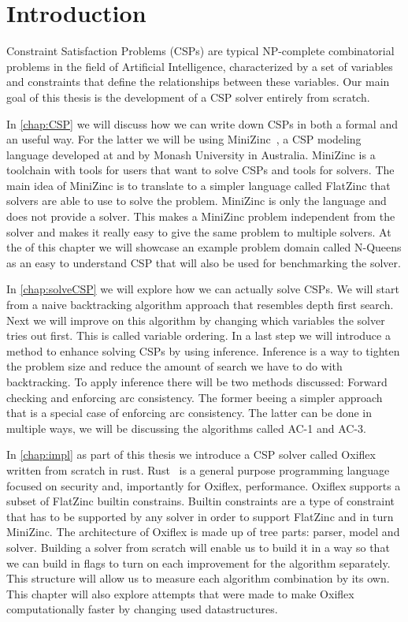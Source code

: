 
\chapter{Introduction}

Constraint Satisfaction Problems (CSPs) are typical NP-complete combinatorial problems in the field of Artificial Intelligence, characterized by a set of variables and constraints that define the relationships between these variables. Our main goal of this thesis is the development of a CSP solver entirely from scratch.

In \cref{chap:CSP} we will discuss how we can write down CSPs in both a formal and an useful way. For the latter we will be using MiniZinc~\cite{minizinc:2007}, a CSP modeling language developed at and by Monash University in Australia. MiniZinc is a toolchain with tools for users that want to solve CSPs and tools for solvers. The main idea of MiniZinc is to translate to a simpler language called FlatZinc that solvers are able to use to solve the problem. MiniZinc is only the language and does not provide a solver. This makes a MiniZinc problem independent from the solver and makes it really easy to give the same problem to multiple solvers. At the of this chapter we will showcase an example problem domain called N-Queens as an easy to understand CSP that will also be used for benchmarking the solver.

In \cref{chap:solveCSP} we will explore how we can actually solve CSPs. We will start from a naive backtracking algorithm approach that resembles depth first search. Next we will improve on this algorithm by changing which variables the solver tries out first. This is called variable ordering. In a last step we will introduce a method to enhance solving CSPs by using inference. Inference is a way to tighten the problem size and reduce the amount of search we have to do with backtracking. To apply inference there will be two methods discussed: Forward checking and enforcing arc consistency. The former beeing a simpler approach that is a special case of enforcing arc consistency. The latter can be done in multiple ways, we will be discussing the algorithms called AC-1 and AC-3.

In \cref{chap:impl} as part of this thesis we introduce a CSP solver called Oxiflex written from scratch in rust. Rust~\cite{rust:2014} is a general purpose programming language focused on security and, importantly for Oxiflex, performance. Oxiflex supports a subset of FlatZinc builtin constrains. Builtin constraints are a type of constraint that has to be supported by any solver in order to support FlatZinc and in turn MiniZinc. The architecture of Oxiflex is made up of tree parts: parser, model and solver. Building a solver from scratch will enable us to build it in a way so that we can build in flags to turn on each improvement for the algorithm separately. This structure will allow us to measure each algorithm combination by its own. This chapter will also explore attempts that were made to make Oxiflex computationally faster by changing used datastructures.

